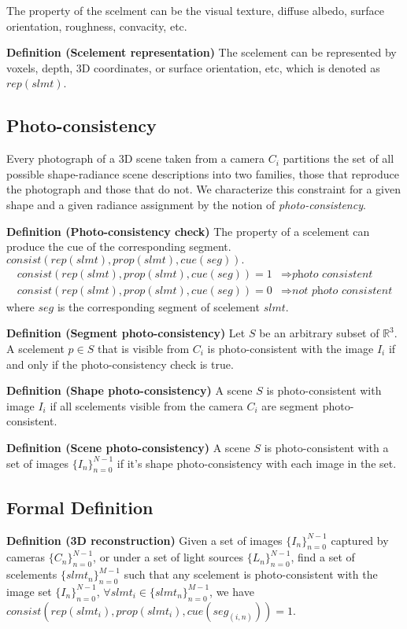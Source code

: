 The property of the scelment can be the visual texture, diffuse albedo, surface orientation, roughness, convacity, etc.

\textbf{Definition (Scelement representation)} The scelement can be represented by voxels, depth, 3D coordinates, or surface orientation, etc, which is denoted as $rep(slmt)$.

\subsection{Photo-consistency}
Every photograph of a 3D scene taken from a camera $C_i$ partitions the set of all possible shape-radiance scene descriptions into two families, those that reproduce the photograph and those that do not. We characterize this constraint for a given shape and a given radiance assignment by the notion of \textit{photo-consistency}.

\textbf{Definition (Photo-consistency check)} The property of a scelement can produce the cue of the corresponding segment. $consist(rep(slmt), prop(slmt), cue(seg)).$
\begin{align*}
consist(rep(slmt), prop(slmt), cue(seg)) = 1 &\Rightarrow \textit{photo consistent}\\
consist(rep(slmt), prop(slmt), cue(seg)) = 0 &\Rightarrow \textit{not photo consistent}
\end{align*}
where $seg$ is the corresponding segment of scelement $slmt$.

\textbf{Definition (Segment photo-consistency)} Let $S$ be an arbitrary subset of $\mathbb{R}^3$. A scelement $p\in S$ that is visible from $C_i$ is photo-consistent with the image $I_i$ if and only if the photo-consistency check is true.

\textbf{Definition (Shape photo-consistency)} A scene $S$ is photo-consistent with image $I_i$ if all scelements visible from the camera $C_i$ are segment photo-consistent.

\textbf{Definition (Scene photo-consistency)} A scene $S$ is photo-consistent with a set of images $\{I_n\}_{n=0}^{N-1}$ if it's shape photo-consistency with each image in the set.

\subsection{Formal Definition}
\textbf{Definition (3D reconstruction)} Given a set of images $\{I_n\}_{n=0}^{N-1}$ captured by cameras $\{C_n\}_{n=0}^{N-1}$, or under a set of light sources $\{L_n\}_{n=0}^{N-1}$, find a set of scelements $\{slmt_n\}_{n=0}^{M-1}$ such that any scelement is photo-consistent with the image set $\{I_n\}_{n=0}^{N-1}$, \ie $\forall slmt_i\in \{slmt_n\}_{n=0}^{M-1}$, we have $consist(rep(slmt_i), prop(slmt_i), cue(seg_{(i, n)})) = 1$.

